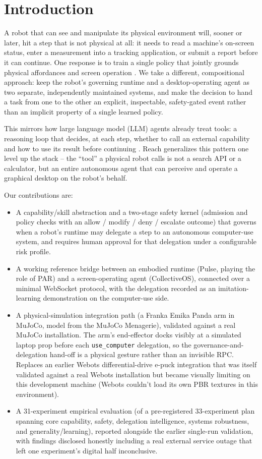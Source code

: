 \documentclass[conference]{IEEEtran}
\begin{document}
\section{Introduction}
A robot that can see and manipulate its physical environment will, sooner or later, hit a step that is
not physical at all: it needs to read a machine's on-screen status, enter a measurement into a tracking
application, or submit a report before it can continue. One response is to train a single policy that jointly
grounds physical affordances and screen operation \cite{driess2023palme,brohan2023rt2}. We take a different, compositional approach: keep
the robot's governing runtime and a desktop-operating agent as two separate, independently maintained
systems, and make the decision to hand a task from one to the other an explicit, inspectable, safety-gated
event rather than an implicit property of a single learned policy.

This mirrors how large language model (LLM) agents already treat tools: a reasoning loop that decides,
at each step, whether to call an external capability and how to use its result before continuing \cite{yao2023react,schick2023toolformer}. Reach
generalizes this pattern one level up the stack -- the ``tool'' a physical robot calls is not a search API or a
calculator, but an entire autonomous agent that can perceive and operate a graphical desktop on the robot's
behalf.

Our contributions are:
\begin{itemize}
\item A capability/skill abstraction and a two-stage safety kernel (admission and policy checks with an
allow / modify / deny / escalate outcome) that governs when a robot's runtime may delegate a step
to an autonomous computer-use system, and requires human approval for that delegation under a
configurable risk profile.
\item A working reference bridge between an embodied runtime (Pulse, playing the role of PAR) and a screen-operating agent (CollectiveOS), connected over a minimal WebSocket protocol, with the delegation
recorded as an imitation-learning demonstration on the computer-use side.
\item A physical-simulation integration path (a Franka Emika Panda arm in MuJoCo, model from the MuJoCo
Menagerie), validated against a real MuJoCo installation. The arm's end-effector docks visibly at a
simulated laptop prop before each \texttt{use\_computer} delegation, so the governance-and-delegation
hand-off is a physical gesture rather than an invisible RPC. Replaces an earlier Webots differential-drive
e-puck integration that was itself validated against a real Webots installation but became visually
limiting on this development machine (Webots couldn't load its own PBR textures in this environment).
\item A 31-experiment empirical evaluation (of a pre-registered 33-experiment plan spanning core
capability, safety, delegation intelligence, systems robustness, and generality/learning), reported
alongside the earlier single-run validation, with findings disclosed honestly including a real external
service outage that left one experiment's digital half inconclusive.
\end{itemize}
\end{document}
